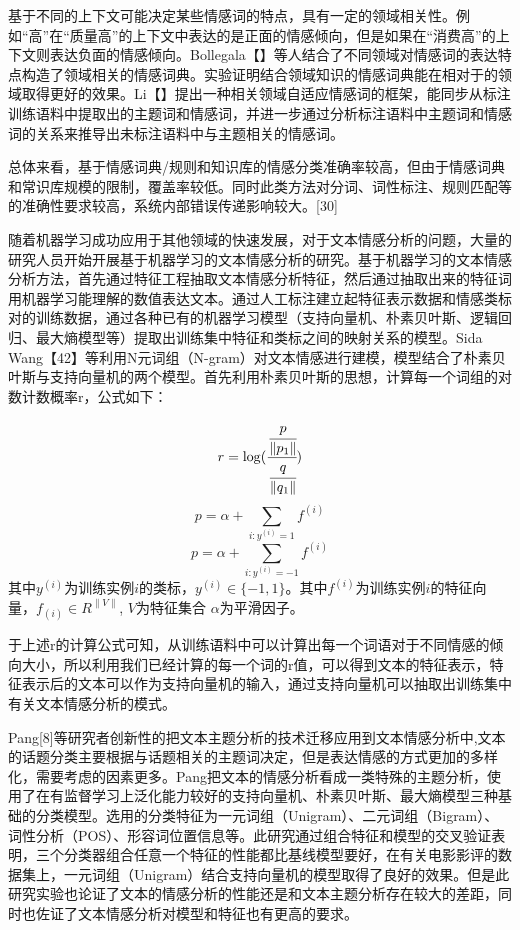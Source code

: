 基于不同的上下文可能决定某些情感词的特点，具有一定的领域相关性。例如“高”在“质量高”的上下文中表达的是正面的情感倾向，但是如果在“消费高”的上下文则表达负面的情感倾向。Bollegala【】等人结合了不同领域对情感词的表达特点构造了领域相关的情感词典。实验证明结合领域知识的情感词典能在相对于的领域取得更好的效果。Li【】提出一种相关领域自适应情感词的框架，能同步从标注训练语料中提取出的主题词和情感词，并进一步通过分析标注语料中主题词和情感词的关系来推导出未标注语料中与主题相关的情感词。

总体来看，基于情感词典/规则和知识库的情感分类准确率较高，但由于情感词典和常识库规模的限制，覆盖率较低。同时此类方法对分词、词性标注、规则匹配等的准确性要求较高，系统内部错误传递影响较大。[30]


随着机器学习成功应用于其他领域的快速发展，对于文本情感分析的问题，大量的研究人员开始开展基于机器学习的文本情感分析的研究。基于机器学习的文本情感分析方法，首先通过特征工程抽取文本情感分析特征，然后通过抽取出来的特征词用机器学习能理解的数值表达文本。通过人工标注建立起特征表示数据和情感类标对的训练数据，通过各种已有的机器学习模型（支持向量机、朴素贝叶斯、逻辑回归、最大熵模型等）提取出训练集中特征和类标之间的映射关系的模型。Sida Wang【42】等利用N元词组（N-gram）对文本情感进行建模，模型结合了朴素贝叶斯与支持向量机的两个模型。首先利用朴素贝叶斯的思想，计算每一个词组的对数计数概率r，公式如下：


$$r=\log(\cfrac{\cfrac{p}{\|p_1\|}}{\cfrac{q}{\|q_1\|}})$$
$$p=\alpha + \sum_{i:y^{(i)}=1}f^{(i)}$$
$$p=\alpha + \sum_{i:y^{(i)}=-1}f^{(i)}$$
其中$y^{(i)}$为训练实例$i$的类标，$y^{(i)}\in\lbrace-1,1\rbrace$。其中$f^{(i)}$为训练实例$i$的特征向量，$f_{(i)}\in R^{\|V\|}$, $V$为特征集合 $\alpha$为平滑因子。

于上述r的计算公式可知，从训练语料中可以计算出每一个词语对于不同情感的倾向大小，所以利用我们已经计算的每一个词的r值，可以得到文本的特征表示，特征表示后的文本可以作为支持向量机的输入，通过支持向量机可以抽取出训练集中有关文本情感分析的模式。

Pang[8]等研究者创新性的把文本主题分析的技术迁移应用到文本情感分析中,文本的话题分类主要根据与话题相关的主题词决定，但是表达情感的方式更加的多样化，需要考虑的因素更多。Pang把文本的情感分析看成一类特殊的主题分析，使用了在有监督学习上泛化能力较好的支持向量机、朴素贝叶斯、最大熵模型三种基础的分类模型。选用的分类特征为一元词组（Unigram）、二元词组（Bigram）、词性分析（POS）、形容词位置信息等。此研究通过组合特征和模型的交叉验证表明，三个分类器组合任意一个特征的性能都比基线模型要好，在有关电影影评的数据集上，一元词组（Unigram）结合支持向量机的模型取得了良好的效果。但是此研究实验也论证了文本的情感分析的性能还是和文本主题分析存在较大的差距，同时也佐证了文本情感分析对模型和特征也有更高的要求。

